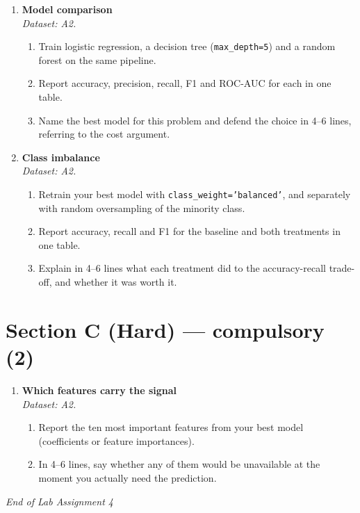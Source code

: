 \documentclass[11pt,a4paper]{article}
\begin{document}
\begin{enumerate}[label=\textbf{B\arabic*.}, leftmargin=*]

  \item \textbf{Model comparison} \\
    \emph{Dataset: A2.}
    \begin{enumerate}[label=(\alph*), leftmargin=*]
      \item Train logistic regression, a decision tree (\texttt{max\_depth=5}) and a random forest on the same pipeline.
      \item Report accuracy, precision, recall, F1 and ROC-AUC for each in one table.
      \item Name the best model for this problem and defend the choice in 4--6 lines, referring to the cost argument.
    \end{enumerate}

  \item \textbf{Class imbalance} \\
    \emph{Dataset: A2.}
    \begin{enumerate}[label=(\alph*), leftmargin=*]
      \item Retrain your best model with \texttt{class\_weight='balanced'}, and separately with random oversampling of the minority class.
      \item Report accuracy, recall and F1 for the baseline and both treatments in one table.
      \item Explain in 4--6 lines what each treatment did to the accuracy-recall trade-off, and whether it was worth it.
    \end{enumerate}

\end{enumerate}

\section*{Section C (Hard) --- compulsory \quad (2)}

\begin{enumerate}[label=\textbf{C\arabic*.}, leftmargin=*]

  \item \textbf{Which features carry the signal} \\
    \emph{Dataset: A2.}
    \begin{enumerate}[label=(\alph*), leftmargin=*]
      \item Report the ten most important features from your best model (coefficients or feature importances).
      \item In 4--6 lines, say whether any of them would be unavailable at the moment you actually need the prediction.
    \end{enumerate}

\end{enumerate}

\vfill\noindent\textit{End of Lab Assignment 4}

\notesources{\AMLLabSources}
\end{document}
